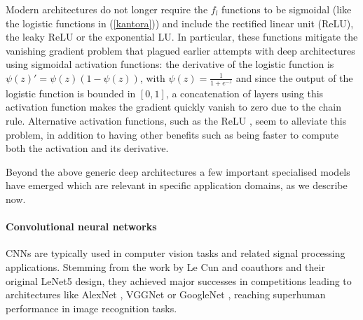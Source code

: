 Modern architectures do not longer require the
$f_l$ functions to be sigmoidal (like the  
logistic functions in (\ref{kantora})) and include  
the rectified linear unit (ReLU), the leaky ReLU
or the exponential LU. In particular, these functions mitigate the vanishing gradient problem \parencite{kolen2001gradient} that 
plagued earlier attempts with deep architectures using sigmoidal
activation functions: the derivative of the logistic function is $\psi(z)' = \psi(z)(1 - \psi(z))$, with $\psi(z) = \frac{1}{1 + e^{-z}}$ and since the output of the logistic function is bounded in $\left[ 0, 1 \right]$, a concatenation of layers using this activation function makes the gradient quickly vanish to zero due to the chain rule. Alternative activation functions, such as the ReLU \parencite{glorot2010understanding}, seem to alleviate this problem, in addition to having other benefits such as being faster to compute both the activation and its derivative.

Beyond the above generic deep architectures 
a few important specialised models have emerged which 
are relevant in specific application domains,
as we describe now. 
\paragraph{Convolutional neural networks} 
CNNs are typically used 
 in computer vision tasks and related signal processing applications.
 Stemming from the work by Le Cun and coauthors  
  \parencite{lecun89, lecun98} and their original 
  LeNet5 design, they achieved major
 successes  in  competitions \parencite{krizhevsky2017imagenet}
 leading to architectures like 
 AlexNet       \parencite{NIPS2012_c399862d}, VGGNet \parencite{simonyan2014very} or
 GoogleNet \parencite{szegedy2015going}, reaching 
 superhuman performance in 
 image recognition tasks.
 

